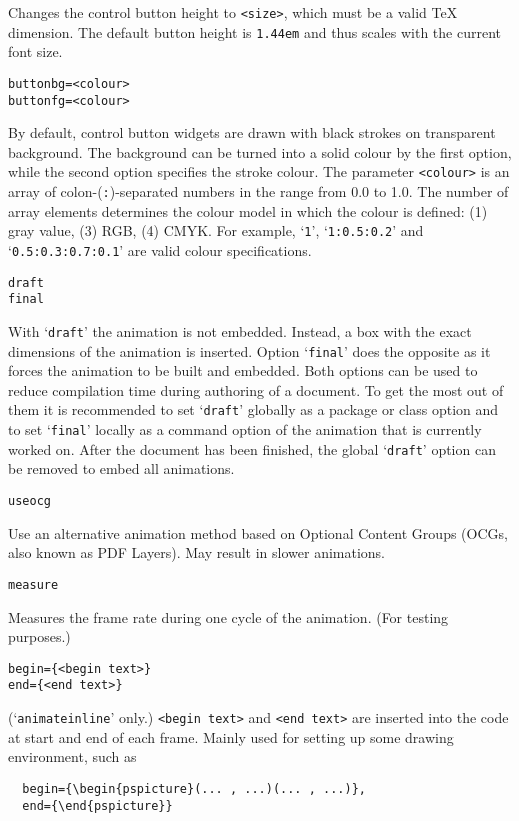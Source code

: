 \documentclass[a4paper]{article}
\begin{document}
Changes the control button height to \verb+<size>+, which must be a valid \TeX{} dimension. The default button height is \verb+1.44em+ and thus scales with the current font size.
\begin{verbatim}
buttonbg=<colour>
buttonfg=<colour>
\end{verbatim}
By default, control button widgets are drawn with black strokes on transparent background. The background can be turned into a solid colour by the first option, while the second option specifies the stroke colour. The parameter \verb+<colour>+ is an array of colon-(\verb+:+)-separated numbers in the range from 0.0 to 1.0. The number of array elements determines the colour model in which the colour is defined: (1) gray value, (3) RGB, (4) CMYK. For example, `\verb+1+', `\verb+1:0.5:0.2+' and `\verb+0.5:0.3:0.7:0.1+' are valid colour specifications.
\begin{verbatim}
draft
final
\end{verbatim}
With `\verb+draft+' the animation is not embedded. Instead, a box with the exact dimensions of the animation is inserted. Option `\verb+final+' does the opposite as it forces the animation to be built and embedded. Both options can be used to reduce compilation time during authoring of a document. To get the most out of them it is recommended to set `\verb+draft+' globally as a package or class option and to set `\verb+final+' locally as a command option of the animation that is currently worked on. After the document has been finished, the global `\verb+draft+' option can be removed to embed all animations.
\begin{verbatim}
useocg
\end{verbatim}
Use an alternative animation method based on Optional Content Groups (OCGs, also known as PDF Layers). May result in slower animations.
\begin{verbatim}
measure
\end{verbatim}
Measures the frame rate during one cycle of the animation. (For testing purposes.)
\begin{verbatim}
begin={<begin text>}
end={<end text>}
\end{verbatim}
(`\verb+animateinline+' only.) \verb+<begin text>+ and \verb+<end text>+ are inserted into the code at start and end of each frame. Mainly used for setting up some drawing environment, such as
\begin{verbatim}
  begin={\begin{pspicture}(... , ...)(... , ...)},
  end={\end{pspicture}}
\end{verbatim}
\end{document}
